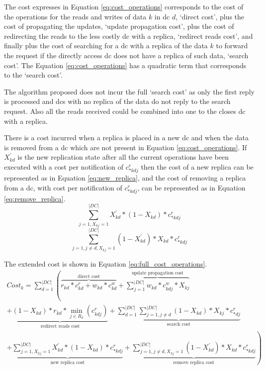 \documentclass[english]{article}
\begin{document}
The cost expresses in Equation \ref{eq:cost_operations} corresponds to the cost of the operations for the reads and writes of data $k$ in \gls{dc} $d$, `direct cost', plus the cost of propagating the updates, `update propagation cost', plus the cost of redirecting the reads to the less costly \gls{dc} with a replica, `redirect reads cost', and finally plus the cost of searching for a \gls{dc} with a replica of the data $k$ to forward the request if the directly access \gls{dc} does not have a replica of such data, `search cost'. The Equation \ref{eq:cost_operations} has a quadratic term that corresponds to the `search cost'.

The algorithm proposed does not incur the full `search cost' as only the first reply is processed and \glspl{dc} with no replica of the data do not reply to the search request. Also all the reads received could be combined into one to the closes \gls{dc} with a replica.

There is a cost incurred when a replica is placed in a new \gls{dc} and when the data is removed from a \gls{dc} which are not present in Equation \ref{eq:cost_operations}. If $X^{'}_{kd}$ is the new replication state after all the current operations have been executed with a cost per notification of $c^{r}_{*kdj}$ then the cost of a new replica can be represented as in Equation \ref{eq:new_replica}, and the cost of removing a replica from a \gls{dc}, with cost per notification of $c^{r}_{*kdj}$, can be represented as in Equation \ref{eq:remove_replica}.
\begin{equation} \label{eq:new_replica}
	\sum^{|DC|}_{j = 1, X_{kj} = 1} X^{'}_{kd} * (1 - X_{kd}) * c^{r}_{*kdj}
\end{equation}
\begin{equation} \label{eq:remove_replica}
	\sum^{|DC|}_{j = 1, j \neq d, X_{kj} = 1} (1 - X^{'}_{kd}) * X_{kd} * c^{r}_{*kdj}
\end{equation}

The extended cost is shown in Equation \ref{eq:full_cost_operations}.
\begin{equation} \label{eq:full_cost_operations}
	\begin{split}
		Cost_{k} = \sum^{|DC|}_{d = 1} \left( \overbrace{r_{kd} * c^{r}_{kd} + w_{kd} * c^{w}_{kd}}^\text{direct cost} + \overbrace{\sum^{|DC|}_{j = 1} w_{kd} * c^{w}_{kdj} * X_{kj}}^\text{update propagation cost} \right. \\ 
		+ \underbrace{(1 - X_{kd}) * r_{kd} * \min_{j \in R_{k}}(c^{r}_{kdj})}_\text{redirect reads cost} + \underbrace{\sum^{|DC|}_{d = 1}  \sum^{|DC|}_{j = 1, j \neq d}  (1 - X_{kd}) * X_{kj} * c^{r}_{*dj}}_\text{search cost} \\
		\left. + \underbrace{\sum^{|DC|}_{j = 1, X_{kj} = 1} X^{'}_{kd} * (1 - X_{kd}) * c^{r}_{*kdj}}_\text{new replica cost} + \underbrace{\sum^{|DC|}_{j = 1, j \neq d, X_{kj} = 1} (1 - X^{'}_{kd}) * X_{kd} * c^{r}_{*kdj}}_\text{remove replica cost} \right)
	\end{split}
\end{equation}
\end{document}
